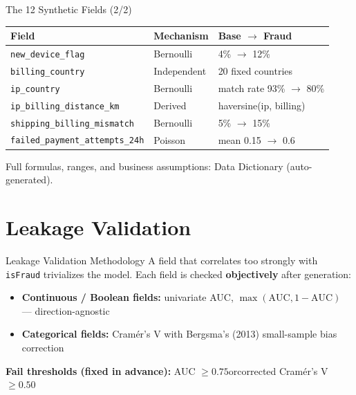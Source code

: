 \documentclass[aspectratio=169]{beamer}
\begin{document}
\begin{frame}{The 12 Synthetic Fields (2/2)}
\centering\scriptsize
\begin{tabular}{@{}lll@{}}
\toprule
\textbf{Field} & \textbf{Mechanism} & \textbf{Base \(\rightarrow\) Fraud} \\
\midrule
\texttt{new\_device\_flag} & Bernoulli & 4\% \(\rightarrow\) 12\% \\
\texttt{billing\_country} & Independent & 20 fixed countries \\
\texttt{ip\_country} & Bernoulli & match rate 93\% \(\rightarrow\) 80\% \\
\texttt{ip\_billing\_distance\_km} & Derived & haversine(ip, billing) \\
\texttt{shipping\_billing\_mismatch} & Bernoulli & 5\% \(\rightarrow\) 15\% \\
\texttt{failed\_payment\_attempts\_24h} & Poisson & mean 0.15 \(\rightarrow\) 0.6 \\
\bottomrule
\end{tabular}

\vspace{0.4cm}
\footnotesize Full formulas, ranges, and business assumptions: Data Dictionary (auto-generated).
\end{frame}

\section{Leakage Validation}

\begin{frame}{Leakage Validation Methodology}
A field that correlates too strongly with \texttt{isFraud} trivializes the model. Each field is checked \textbf{objectively} after generation:
\begin{itemize}
    \item \textbf{Continuous / Boolean fields:} univariate AUC, \(\max(\mathrm{AUC}, 1-\mathrm{AUC})\) --- direction-agnostic
    \item \textbf{Categorical fields:} Cram\'er's V with Bergsma's (2013) small-sample bias correction
\end{itemize}
\vspace{0.3cm}
\textbf{Fail thresholds (fixed in advance):} AUC \(\geq 0.75\)\quad or\quad corrected Cram\'er's V \(\geq 0.50\)
\end{frame}
\end{document}
